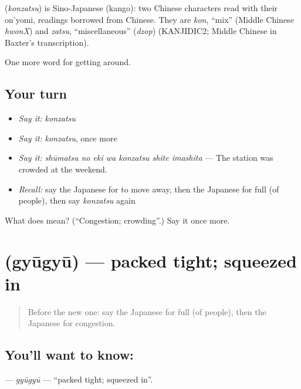 \begin{cousinweb}
\textbf{} (\emph{konzatsu}) is Sino-Japanese (kango): two Chinese characters read with their on'yomi, readings borrowed from Chinese. They are \emph{kon}, \textquotedblleft{}mix\textquotedblright{} (Middle Chinese \emph{hwonX}) and \emph{zatsu}, \textquotedblleft{}miscellaneous\textquotedblright{} (\emph{dzop}) (KANJIDIC2; Middle Chinese in Baxter's transcription).
\end{cousinweb}

\begin{grammarlens}[title={What you've built}]
One more word for getting around.
\end{grammarlens}

\subsection*{Your turn}
\begin{itemize}
\raggedright
  \item \emph{Say it:} \emph{konzatsu}
  \item \emph{Say it:} \emph{konzatsu}, once more
  \item \emph{Say it:} \emph{shūmatsu no eki wa konzatsu shite imashita} — The station was crowded at the weekend.
  \item \emph{Recall:} say the Japanese for to move away, then the Japanese for full (of people), then say \emph{konzatsu} again
\end{itemize}

\begin{tcolorbox}[breakable,colback=teal!4,colframe=teal!35!black,title={Before you move on}]
What does  mean? (\textquotedblleft{}Congestion; crowding\textquotedblright{}.) Say it once more.
\end{tcolorbox}
\section[\texorpdfstring{\ja{ぎゅうぎゅう} (gyūgyū)}{ぎゅうぎゅう (gyūgyū)}]{ (gyūgyū) — packed tight; squeezed in}

\label{lesson:JA-C378-gyuugyuu}



\begin{quote}
Before the new one: say the Japanese for full (of people), then the Japanese for congestion.
\end{quote}

\subsection*{You'll want to know: }
\textbf{} — \emph{gyūgyū} — \textquotedblleft{}packed tight; squeezed in\textquotedblright{}.

